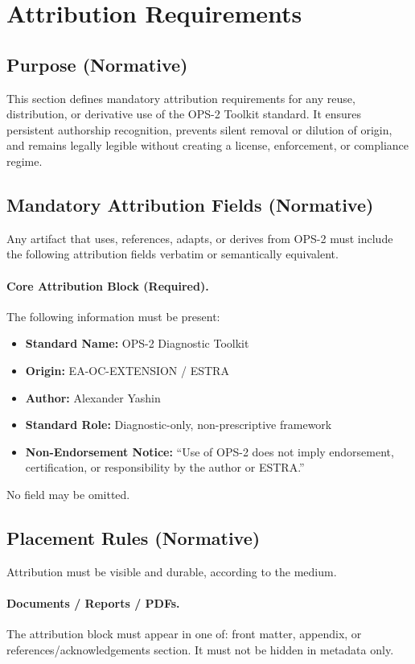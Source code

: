 \section{Attribution Requirements}

\subsection{Purpose (Normative)}
This section defines mandatory attribution requirements for any reuse, distribution, or derivative use of the OPS-2 Toolkit standard.
It ensures persistent authorship recognition, prevents silent removal or dilution of origin, and remains legally legible without creating a license, enforcement, or compliance regime.

\subsection{Mandatory Attribution Fields (Normative)}
Any artifact that uses, references, adapts, or derives from OPS-2 must include the following attribution fields verbatim or semantically equivalent.

\paragraph{Core Attribution Block (Required).}
The following information must be present:
\begin{itemize}
  \item \textbf{Standard Name:} OPS-2 Diagnostic Toolkit
  \item \textbf{Origin:} EA-OC-EXTENSION / ESTRA
  \item \textbf{Author:} Alexander Yashin
  \item \textbf{Standard Role:} Diagnostic-only, non-prescriptive framework
  \item \textbf{Non-Endorsement Notice:} ``Use of OPS-2 does not imply endorsement, certification, or responsibility by the author or ESTRA.''
\end{itemize}
No field may be omitted.

\subsection{Placement Rules (Normative)}
Attribution must be visible and durable, according to the medium.

\paragraph{Documents / Reports / PDFs.}
The attribution block must appear in one of: front matter, appendix, or references/acknowledgements section.
It must not be hidden in metadata only.

